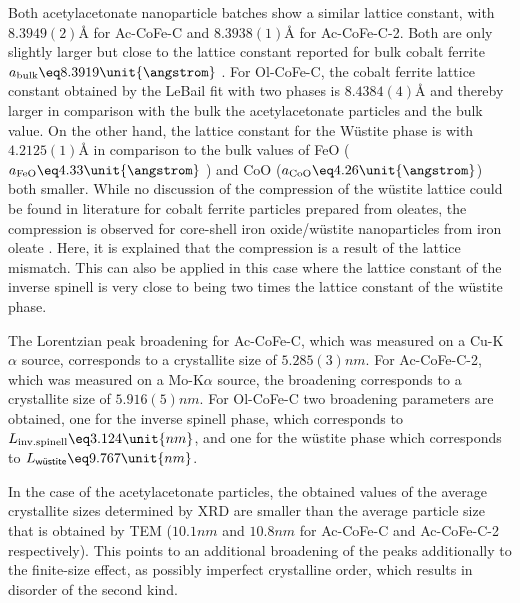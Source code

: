 \documentclass[\main/dresen_thesis.tex]{subfiles}
\begin{document}
    Both acetylacetonate nanoparticle batches show a similar lattice constant, with $8.3949(2) \unit{\angstrom}$ for Ac-CoFe-C and $8.3938(1) \unit{\angstrom}$ for Ac-CoFe-C-2.
    Both are only slightly larger but close to the lattice constant reported for bulk cobalt ferrite $a_\mathrm{bulk} \eq 8.3919 \unit{\angstrom}$ \cite{Stein_2018_Struct}.
    For Ol-CoFe-C, the cobalt ferrite lattice constant obtained by the LeBail fit with two phases is $8.4384(4) \unit{\angstrom}$ and thereby larger in comparison with the bulk the acetylacetonate particles and the bulk value.
    On the other hand, the lattice constant for the W\"ustite phase is with $4.2125(1) \unit{\angstrom}$ in comparison to the bulk values of FeO ($a_\mathrm{FeO} \eq 4.33 \unit{\angstrom}$ \cite{Hentschel_1970_Stoich}) and CoO ($a_\mathrm{CoO} \eq 4.26 \unit{\angstrom}$) both smaller.
    While no discussion of the compression of the w\"ustite lattice could be found in literature for cobalt ferrite particles prepared from oleates, the compression is observed for core-shell iron oxide/w\"ustite nanoparticles from iron oleate  \cite{Wetterskog_2013_Anoma}.
    Here, it is explained that the compression is a result of the lattice mismatch.
    This can also be applied in this case where the lattice constant of the inverse spinell is very close to being two times the lattice constant of the w\"ustite phase.

    The Lorentzian peak broadening for Ac-CoFe-C, which was measured on a Cu-K$\alpha$ source, corresponds to a crystallite size of $5.285(3) \unit{nm}$.
    For Ac-CoFe-C-2, which was measured on a Mo-K$\alpha$ source, the broadening corresponds to a crystallite size of $5.916(5) \unit{nm}$.
    For Ol-CoFe-C two broadening parameters are obtained, one for the inverse spinell phase, which corresponds to $L_{\mathrm{inv. spinell}} \eq 3.124 \unit{nm}$, and one for the w\"ustite phase which corresponds to $L_{\textsf{w\"ustite}} \eq 9.767 \unit{nm}$.

    In the case of the acetylacetonate particles, the obtained values of the average crystallite sizes determined by XRD are smaller than the average particle size that is obtained by TEM ($10.1 \unit{nm}$ and $10.8 \unit{nm}$ for Ac-CoFe-C and Ac-CoFe-C-2 respectively).
    This points to an additional broadening of the peaks additionally to the finite-size effect, as possibly imperfect crystalline order, which results in disorder of the second kind.
\end{document}
